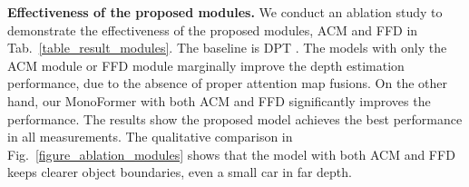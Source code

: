\documentclass[letterpaper]{article} \usepackage{aaai23}  \usepackage{times}  \usepackage{helvet}  \usepackage{courier}  \usepackage[hyphens]{url}  \usepackage{graphicx} \urlstyle{rm} \def\UrlFont{\rm}  \usepackage{natbib}  \usepackage{caption} \frenchspacing  \setlength{\pdfpagewidth}{8.5in} \setlength{\pdfpageheight}{11in} \usepackage{algorithm}
\newcommand{\tabref}[1]{Tab.~\ref{#1}}
\newcommand{\figref}[1]{Fig.~\ref{#1}}
\begin{document}
\begin{table}[t]
    \centering
    \small
    \caption{\textbf{Comparison to another hybrid model.} The error (Abs Rel, RMSE) reduction and accuracy ($\delta < 1.25$, $\delta < 1.25^2 $) improvement percentage from TransDepth~\cite{yang2021transformer} to our Monoformer.} 
    \label{tab:transdepth}
\end{table}


\noindent \textbf{Effectiveness of the proposed modules.} We conduct an ablation study to demonstrate the effectiveness of the proposed modules, ACM and FFD in \tabref{table_result_modules}.
The baseline is DPT \cite{ranftl2021vision}.
The models with only the ACM module or FFD module marginally improve the depth estimation performance, due to the absence of proper attention map fusions. On the other hand, our MonoFormer with both ACM and FFD significantly improves the performance. The results show the proposed model achieves the best performance in all measurements. The qualitative comparison in \figref{figure_ablation_modules} shows that the model with both ACM and FFD keeps clearer object boundaries, even a small car in far depth.
\end{document}
